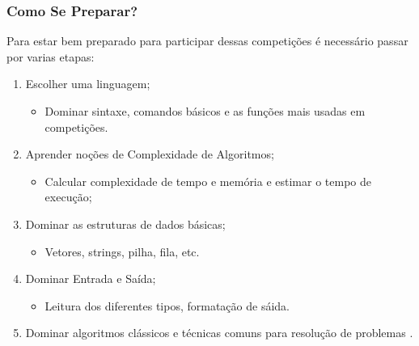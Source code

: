 \begin{frame}
\frametitle{Como Se Preparar?}
\begin{block}{}
Para estar bem preparado para participar dessas competições é necessário passar por varias etapas:
\begin{enumerate}
	\item Escolher uma linguagem;
	\begin{itemize}
		\item Dominar sintaxe, comandos básicos e as funções mais usadas em competições.
	\end{itemize}
	\item Aprender noções de Complexidade de Algoritmos;
	\begin{itemize}
		\item Calcular complexidade de tempo e memória e estimar o tempo de execução;
	\end{itemize}
	\item Dominar as estruturas de dados básicas;
	\begin{itemize}
		\item Vetores, strings, pilha, fila, etc.
	\end{itemize}
	\item Dominar Entrada e Saída;
	\begin{itemize}
		\item Leitura dos diferentes tipos, formatação de sáida.
	\end{itemize}
	\item Dominar algoritmos clássicos e técnicas comuns para resolução de problemas .
\end{enumerate}
\end{block}
\end{frame}

